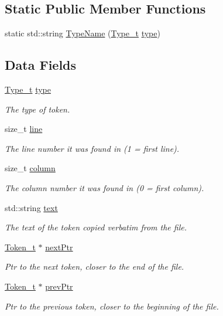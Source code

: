 \subsection*{Static Public Member Functions}
\begin{DoxyCompactItemize}
\item 
static std\+::string \hyperlink{struct_token__t_a17a176ab7b99c7bbe377971ffac505bf}{Type\+Name} (\hyperlink{struct_token__t_a344cbfed08291bcbc163935eb646c601}{Type\+\_\+t} \hyperlink{struct_token__t_a2fc2e613dd3946fe8303b3031cf3aecd}{type})
\end{DoxyCompactItemize}
\subsection*{Data Fields}
\begin{DoxyCompactItemize}
\item 
\hyperlink{struct_token__t_a344cbfed08291bcbc163935eb646c601}{Type\+\_\+t} \hyperlink{struct_token__t_a2fc2e613dd3946fe8303b3031cf3aecd}{type}
\begin{DoxyCompactList}\small\item\em The type of token. \end{DoxyCompactList}\item 
size\+\_\+t \hyperlink{struct_token__t_a4a2837e2ebb92d21ec481ce1a68960eb}{line}
\begin{DoxyCompactList}\small\item\em The line number it was found in (1 = first line). \end{DoxyCompactList}\item 
size\+\_\+t \hyperlink{struct_token__t_a5a02885896119c4aaa637c56ffd98b51}{column}
\begin{DoxyCompactList}\small\item\em The column number it was found in (0 = first column). \end{DoxyCompactList}\item 
std\+::string \hyperlink{struct_token__t_a522c94f6add5e3a4ff05d92e1e7a2403}{text}
\begin{DoxyCompactList}\small\item\em The text of the token copied verbatim from the file. \end{DoxyCompactList}\item 
\hyperlink{struct_token__t}{Token\+\_\+t} $\ast$ \hyperlink{struct_token__t_a0be03dce42ee8f49413fe312558e79c4}{next\+Ptr}
\begin{DoxyCompactList}\small\item\em Ptr to the next token, closer to the end of the file. \end{DoxyCompactList}\item 
\hyperlink{struct_token__t}{Token\+\_\+t} $\ast$ \hyperlink{struct_token__t_a888cc048a61a7c120a683b833617c9ae}{prev\+Ptr}
\begin{DoxyCompactList}\small\item\em Ptr to the previous token, closer to the beginning of the file. \end{DoxyCompactList}\end{DoxyCompactItemize}

